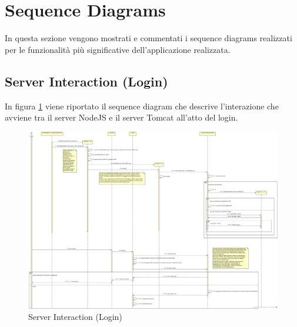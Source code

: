 
\textual


\section{Sequence Diagrams}

In questa sezione vengono mostrati e commentati i sequence diagrams realizzati per le funzionalità più significative dell'applicazione realizzata.

\subsection{Server Interaction (Login)}

In figura \ref{gfx:serverinteractionlogin} viene riportato il sequence diagram che descrive l'interazione che avviene tra il server NodeJS e il server Tomcat all'atto del login.

\begin{landscape}
\begin{center}

\begin{figure}[!htbp]
	\centering
	\includegraphics[scale = .31]{img/sequence_serverint.png}
	\caption{Server Interaction (Login)}
	\label{gfx:serverinteractionlogin}
\end{figure}
\end{center}	
\end{landscape}%

